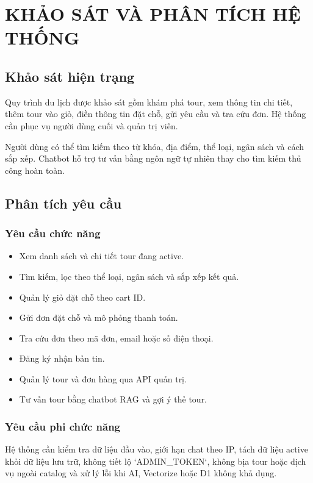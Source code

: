 \setcounter{chapter}{1}
\setcounter{chapter}{1}
\setcounter{table}{0}
\setcounter{figure}{0}
\chapter{KHẢO SÁT VÀ PHÂN TÍCH HỆ THỐNG}


\section{Khảo sát hiện trạng}
Quy trình du lịch được khảo sát gồm khám phá tour, xem thông tin chi tiết, thêm tour vào giỏ, điền thông tin đặt chỗ, gửi yêu cầu và tra cứu đơn. Hệ thống cần phục vụ người dùng cuối và quản trị viên.

Người dùng có thể tìm kiếm theo từ khóa, địa điểm, thể loại, ngân sách và cách sắp xếp. Chatbot hỗ trợ tư vấn bằng ngôn ngữ tự nhiên thay cho tìm kiếm thủ công hoàn toàn.

\section{Phân tích yêu cầu}
\subsection{Yêu cầu chức năng}
\begin{itemize}
    \item Xem danh sách và chi tiết tour đang active.
    \item Tìm kiếm, lọc theo thể loại, ngân sách và sắp xếp kết quả.
    \item Quản lý giỏ đặt chỗ theo cart ID.
    \item Gửi đơn đặt chỗ và mô phỏng thanh toán.
    \item Tra cứu đơn theo mã đơn, email hoặc số điện thoại.
    \item Đăng ký nhận bản tin.
    \item Quản lý tour và đơn hàng qua API quản trị.
    \item Tư vấn tour bằng chatbot RAG và gợi ý thẻ tour.
\end{itemize}

\subsection{Yêu cầu phi chức năng}
Hệ thống cần kiểm tra dữ liệu đầu vào, giới hạn chat theo IP, tách dữ liệu active khỏi dữ liệu lưu trữ, không tiết lộ `ADMIN_TOKEN`, không bịa tour hoặc dịch vụ ngoài catalog và xử lý lỗi khi AI, Vectorize hoặc D1 không khả dụng.

